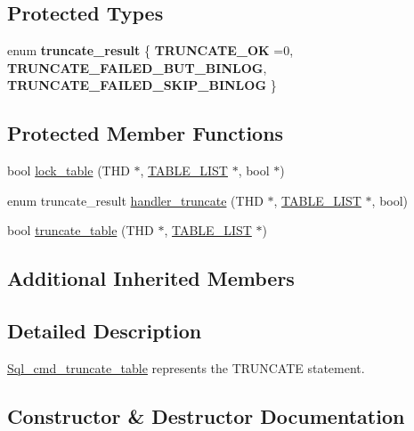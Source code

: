 \subsection*{Protected Types}
\begin{DoxyCompactItemize}
\item 
\mbox{\label{classSql__cmd__truncate__table_a19fce3173c903881291aecf2fe90ef23}} 
enum {\bfseries truncate\+\_\+result} \{ {\bfseries T\+R\+U\+N\+C\+A\+T\+E\+\_\+\+OK} =0, 
{\bfseries T\+R\+U\+N\+C\+A\+T\+E\+\_\+\+F\+A\+I\+L\+E\+D\+\_\+\+B\+U\+T\+\_\+\+B\+I\+N\+L\+OG}, 
{\bfseries T\+R\+U\+N\+C\+A\+T\+E\+\_\+\+F\+A\+I\+L\+E\+D\+\_\+\+S\+K\+I\+P\+\_\+\+B\+I\+N\+L\+OG}
 \}
\end{DoxyCompactItemize}
\subsection*{Protected Member Functions}
\begin{DoxyCompactItemize}
\item 
bool \mbox{\hyperlink{classSql__cmd__truncate__table_a36988cde3d2fc5b7314c7b42ba62e636}{lock\+\_\+table}} (T\+HD $\ast$, \mbox{\hyperlink{structTABLE__LIST}{T\+A\+B\+L\+E\+\_\+\+L\+I\+ST}} $\ast$, bool $\ast$)
\item 
enum truncate\+\_\+result \mbox{\hyperlink{classSql__cmd__truncate__table_a5b4a65ae4c9c9efb13ae88ca3a96cfa5}{handler\+\_\+truncate}} (T\+HD $\ast$, \mbox{\hyperlink{structTABLE__LIST}{T\+A\+B\+L\+E\+\_\+\+L\+I\+ST}} $\ast$, bool)
\item 
bool \mbox{\hyperlink{classSql__cmd__truncate__table_afed41fd98851c52b23fee9e30e9fe981}{truncate\+\_\+table}} (T\+HD $\ast$, \mbox{\hyperlink{structTABLE__LIST}{T\+A\+B\+L\+E\+\_\+\+L\+I\+ST}} $\ast$)
\end{DoxyCompactItemize}
\subsection*{Additional Inherited Members}


\subsection{Detailed Description}
\mbox{\hyperlink{classSql__cmd__truncate__table}{Sql\+\_\+cmd\+\_\+truncate\+\_\+table}} represents the T\+R\+U\+N\+C\+A\+TE statement. 

\subsection{Constructor \& Destructor Documentation}
\mbox{\label{classSql__cmd__truncate__table_af23ab87bb9de25769dc89a30361855dd}} 
